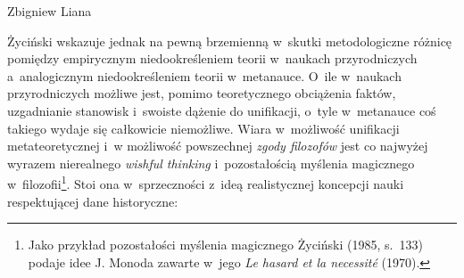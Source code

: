 \begin{artplenv}{Zbigniew Liana}


Życiński wskazuje jednak
\parencite[][s.~133.161-164]{zycinski_teizm_1985} %
 na pewną brzemienną w~skutki metodologiczne różnicę pomiędzy empirycznym niedookreśleniem teorii w~naukach przyrodniczych a~analogicznym niedookreśleniem teorii w~metanauce. O~ile w~naukach przyrodniczych możliwe jest, pomimo teoretycznego obciążenia faktów, uzgadnianie stanowisk i~swoiste dążenie do unifikacji, o~tyle w~metanauce coś takiego wydaje się całkowicie niemożliwe. Wiara w~możliwość unifikacji metateoretycznej i~w możliwość powszechnej \textit{zgody filozofów} jest co najwyżej wyrazem nierealnego \textit{wishful thinking} i~pozostałością myślenia magicznego w~filozofii\footnote{Jako przykład pozostałości myślenia magicznego Życiński (1985, s.~133) podaje idee J. Monoda zawarte w~jego \textit{Le hasard et la necessité} (1970).}. Stoi ona w~sprzeczności z~ideą realistycznej koncepcji nauki respektującej dane historyczne:




\end{artplenv}
